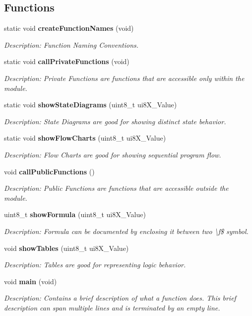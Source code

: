 \subsection*{Functions}
\begin{DoxyCompactItemize}
\item 
static void {\bf create\-Function\-Names} (void)
\begin{DoxyCompactList}\small\item\em Description\-: Function Naming Conventions. \end{DoxyCompactList}\item 
static void {\bf call\-Private\-Functions} (void)
\begin{DoxyCompactList}\small\item\em Description\-: Private Functions are functions that are accessible only within the module. \end{DoxyCompactList}\item 
static void {\bf show\-State\-Diagrams} (uint8\-\_\-t ui8\-X\-\_\-\-Value)
\begin{DoxyCompactList}\small\item\em Description\-: State Diagrams are good for showing distinct state behavior. \end{DoxyCompactList}\item 
static void {\bf show\-Flow\-Charts} (uint8\-\_\-t ui8\-X\-\_\-\-Value)
\begin{DoxyCompactList}\small\item\em Description\-: Flow Charts are good for showing sequential program flow. \end{DoxyCompactList}\item 
void {\bf call\-Public\-Functions} ()
\begin{DoxyCompactList}\small\item\em Description\-: Public Functions are functions that are accessible outside the module. \end{DoxyCompactList}\item 
uint8\-\_\-t {\bf show\-Formula} (uint8\-\_\-t ui8\-X\-\_\-\-Value)
\begin{DoxyCompactList}\small\item\em Description\-: Formula can be documented by enclosing it between two \textbackslash{}f\$ symbol. \end{DoxyCompactList}\item 
void {\bf show\-Tables} (uint8\-\_\-t ui8\-X\-\_\-\-Value)
\begin{DoxyCompactList}\small\item\em Description\-: Tables are good for representing logic behavior. \end{DoxyCompactList}\item 
void {\bf main} (void)
\begin{DoxyCompactList}\small\item\em Description\-: Contains a brief description of what a function does. This brief description can span multiple lines and is terminated by an empty line. \end{DoxyCompactList}\end{DoxyCompactItemize}
